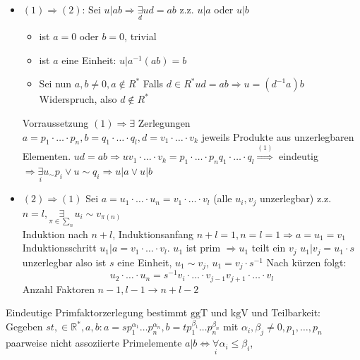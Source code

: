 \documentclass{article}
\newcommand{\R}{\mathbb{R}}
\newcommand{\ggT}{\text{ggT}}
\newcommand{\kgV}{\text{kgV}}
\begin{document}
\begin{itemize}
    \item
        $(1)\Rightarrow (2)$:
        Sei $u|ab\Rightarrow\underset{d}\exists ud=ab$
        z.z. $u|a$ oder $u|b$
        \begin{itemize}
            \item
                ist $a=0$ oder $b=0$, trivial
            \item
                ist $a$ eine Einheit:
                $u|a^{-1}(ab)=b$
            \item
                Sei nun $a,b\neq 0,a\notin R^*$
                Falls $d\in R^* ud=ab\Rightarrow
                u=(d^{-1}a)b$ Widerspruch,
                also $d\notin R^*$
        \end{itemize}
        Vorraussetzung $(1)\Rightarrow\exists$ Zerlegungen
        $a=p_1\cdot\hdots\cdot p_n,b=q_1\cdot\hdots\cdot
        q_l, d=v_1\cdot\hdots\cdot v_k$ jeweils Produkte
        aus unzerlegbaren Elementen. $ud=ab\Rightarrow
        uv_1\cdot\hdots\cdot v_k=p_1\cdot\hdots\cdot p_n
        q_1\cdot\hdots\cdot q_l\overset{(1)}\Rightarrow$
        eindeutig $\Rightarrow\underset{i}\exists u_\sim p_i
        \lor u\sim q_i\Rightarrow u|a\lor u|b$
    \item
        $(2)\Rightarrow (1)$ Sei $a=u_1\cdot\hdots\cdot u_n=
        v_1\cdot\hdots\cdot v_l$ (alle $u_i,v_j$ unzerlegbar)
        z.z. $n=l,\underset{\pi\in\sum_n}\exists u_i\sim
        v_{\pi(n)}$\\
        Induktion nach $n+l$, Induktionsanfang $n+l=1,n=l=1
        \Rightarrow a=u_1=v_1$\\
        Induktionsschritt $u_1|a=v_1\cdot\hdots\cdot v_l$.
        $u_1$ ist prim $\Rightarrow u_1$ teilt ein $v_j$
        $u_1|v_j=u_1\cdot s$ unzerlegbar also ist $s$ eine
        Einheit, $u_1\sim v_j$, $u_1=v_j\cdot s^{-1}$
        Nach kürzen folgt:
        \begin{equation*}
            u_2\cdot\hdots\cdot u_n=s^{-1}v_i\cdot\hdots
            \cdot v_{j-1}v_{j+1}\cdot\hdots\cdot v_l
        \end{equation*}
        Anzahl Faktoren $n-1,l-1\rightarrow n+l-2$
\end{itemize}
Eindeutige Primfaktorzerlegung bestimmt $\ggT$ und $\kgV$
und Teilbarkeit:\\
Gegeben $st,\in\R^*,a,b:a=sp_1^{\alpha_1}\hdots
p_n^{\alpha_n}, b=tp_1^{\beta_1}\hdots p_n^{\beta_n}$ mit
$\alpha_i, \beta_j\neq 0,p_1,\hdots,p_n$ paarweise nicht
assoziierte Primelemente
$a|b\Leftrightarrow\underset{i}\forall\alpha_i\leq\beta_i$,
\end{document}
